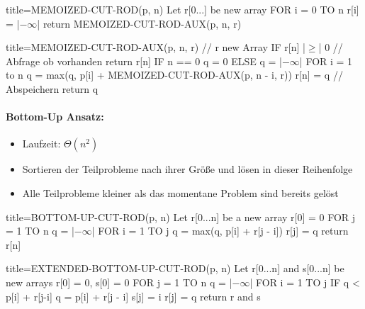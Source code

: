 \documentclass[
    ngerman,
    color=3b,
    load_common, %
    summary,
    boxarc,
]{rubos-tuda-template}
\begin{document}
\begin{codeBlock}[autogobble,escapeinside=||]{title={MEMOIZED-CUT-ROD(p, n)}}
    Let r[0...] be new array
    FOR i = 0 TO n
        r[i] = |$-\infty$|
    return MEMOIZED-CUT-ROD-AUX(p, n, r)
\end{codeBlock}
\begin{codeBlock}[autogobble,escapeinside=||]{title={MEMOIZED-CUT-ROD-AUX(p, n, r)       // r new Array}}
    IF r[n] |$\geq$| 0                        // Abfrage ob vorhanden
        return r[n]
    IF n == 0
        q = 0
    ELSE
        q = |$-\infty$|
        FOR i = 1 to n
        q = max(q, p[i] + MEMOIZED-CUT-ROD-AUX(p, n - i, r))
    r[n] = q                            // Abspeichern
    return q
\end{codeBlock}
\pagebreak
\paragraph{Bottom-Up Ansatz:}
\begin{itemize}
    \item Laufzeit: $\Theta(n^2)$
    \item Sortieren der Teilprobleme nach ihrer Grö\ss e und lösen in dieser Reihenfolge
    \item Alle Teilprobleme kleiner als das momentane Problem sind bereits gelöst
\end{itemize}
\begin{minipage}[t]{.46\textwidth}\mbox{}
    \begin{codeBlock}[autogobble,escapeinside=||]{title={BOTTOM-UP-CUT-ROD(p, n)}}
        Let r[0...n] be a new array
        r[0] = 0
        FOR j = 1 TO n
            q = |$-\infty$|
            FOR i = 1 TO j
                q = max(q, p[i] + r[j - i])
            r[j] = q
        return r[n]
    \end{codeBlock}
\end{minipage}
\begin{minipage}[t]{.54\textwidth-2.22166pt}\mbox{}
    \begin{codeBlock}[autogobble,escapeinside=||]{title={EXTENDED-BOTTOM-UP-CUT-ROD(p, n)}}
        Let r[0...n] and s[0...n] be  new arrays
        r[0] = 0, s[0] = 0
        FOR j = 1 TO n
            q = |$-\infty$|
            FOR i = 1 TO j
                IF q < p[i] + r[j-i]
                    q = p[i] + r[j - i]
                    s[j] = i
            r[j] = q
        return r and s
    \end{codeBlock}
\end{minipage}
\end{document}
